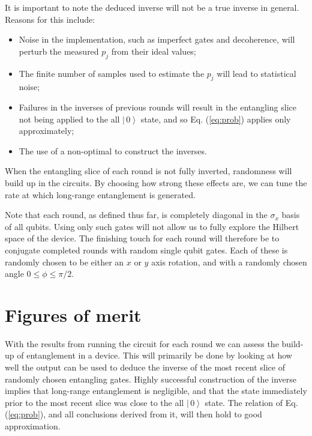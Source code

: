\documentclass[aps,prl,twocolumn,showpacs,preprintnumbers]{revtex4-1}
\newcommand{\ket}[1]{\left | \, #1 \right\rangle}
\begin{document}
It is important to note the deduced inverse will not be a true inverse in general. Reasons for this include:
\begin{itemize}
\item Noise in the implementation, such as imperfect gates and decoherence, will perturb the measured $p_j$ from their ideal values;
\item The finite number of samples used to estimate the $p_j$ will lead to statistical noise;
\item Failures in the inverses of previous rounds will result in the entangling slice not being applied to the all $\ket{0}$ state, and so Eq. (\ref{eq:prob}) applies only approximately;
\item The use of a non-optimal to construct the inverses.
\end{itemize}


When the entangling slice of each round is not fully inverted, randomness will build up in the circuits. By choosing how strong these effects are, we can tune the rate at which long-range entanglement is generated.

Note that each round, as defined thus far, is completely diagonal in the $\sigma_x$ basis of all qubits. Using only such gates will not allow us to fully explore the Hilbert space of the device. The finishing touch for each round will therefore be to conjugate completed rounds with random single qubit gates. Each of these is randomly chosen to be either an $x$ or $y$ axis rotation, and with a randomly chosen angle $0\leq\phi\leq\pi/2$.


\section{Figures of merit}

With the results from running the circuit for each round we can assess the build-up of entanglement in a device. This will primarily be done by looking at how well the output can be used to deduce the inverse of the most recent slice of randomly chosen entangling gates. Highly successful construction of the inverse implies that long-range entanglement is negligible, and that the state immediately prior to the most recent slice was close to the all $\ket{0}$ state. The relation of Eq. (\ref{eq:prob}), and all conclusions derived from it, will then hold to good approximation.
\end{document}

